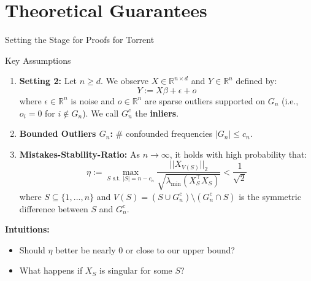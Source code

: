\section{Theoretical Guarantees}

\begin{frame}[shrink=10]{Setting the Stage for Proofs for Torrent}
    \begin{block}{Key Assumptions}
        \begin{enumerate}
            \item \textbf{Setting 2:} Let $n \geq d$. We observe $X \in \mathbb{R}^{n \times d}$ and $Y \in \mathbb{R}^n$ defined by:
        \begin{equation*}
            Y := X\beta + \epsilon + o
        \end{equation*}
            where $\epsilon \in \mathbb{R}^n$ is noise and $o \in \mathbb{R}^n$ are sparse outliers supported on $G_n$ (i.e., $o_i = 0$ for $i \notin G_n$). We call $G_n^c$ the \textbf{inliers}.
            \item \textbf{Bounded Outliers $G_n$:} \# confounded frequencies $|G_n| \le c_n$.
            \item \textbf{Mistakes-Stability-Ratio:} As $n \to \infty$, it holds with high probability that:
            $$ \eta := \max_{S \text{ s.t. } |S|=n-c_n} \frac{||X_{V(S)}||_2}{\sqrt{\lambda_{\min}(X_S^\top X_S)}} < \frac{1}{\sqrt{2}} $$
            where $S \subseteq \{1, ..., n\}$ and $V(S) = (S \cup G_n^c) \setminus (G_n^c \cap S)$ is the symmetric difference between $S$ and $G_n^c$.
        \end{enumerate}
    \end{block}

    \textbf{Intuitions:}
    \begin{itemize}
        \item Should $\eta$ better be nearly $0$ or close to our upper bound?
        \item What happens if $X_S$ is singular for some $S$?
    \end{itemize}
\end{frame}

